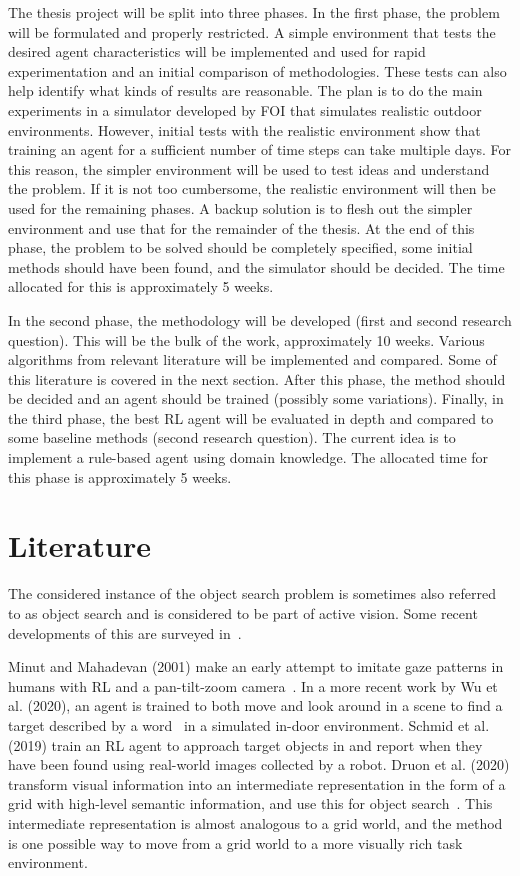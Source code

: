 \documentclass{article}
\begin{document}
The thesis project will be split into three phases. In the first phase, the problem will be formulated and properly restricted. A simple environment that tests the desired agent characteristics will be implemented and used for rapid experimentation and an initial comparison of methodologies. These tests can also help identify what kinds of results are reasonable. The plan is to do the main experiments in a simulator developed by FOI that simulates realistic outdoor environments. However, initial tests with the realistic environment show that training an agent for a sufficient number of time steps can take multiple days. For this reason, the simpler environment will be used to test ideas and understand the problem. If it is not too cumbersome, the realistic environment will then be used for the remaining phases. A backup solution is to flesh out the simpler environment and use that for the remainder of the thesis. At the end of this phase, the problem to be solved should be completely specified, some initial methods should have been found, and the simulator should be decided. The time allocated for this is approximately 5 weeks.

In the second phase, the methodology will be developed (first and second research question). This will be the bulk of the work, approximately 10 weeks. Various algorithms from relevant literature will be implemented and compared. Some of this literature is covered in the next section. After this phase, the method should be decided and an agent should be trained (possibly some variations). Finally, in the third phase, the best RL agent will be evaluated in depth and compared to some baseline methods (second research question). The current idea is to implement a rule-based agent using domain knowledge. The allocated time for this phase is approximately 5 weeks.

\section{Literature}

The considered instance of the object search problem is sometimes also referred to as object search and is considered to be part of active vision. Some recent developments of this are surveyed in~\cite{chen2011}.

Minut and Mahadevan (2001) make an early attempt to imitate gaze patterns in humans with RL and a pan-tilt-zoom camera~\cite{minut2001}. In a more recent work by Wu et al. (2020), an agent is trained to both move and look around in a scene to find a target described by a word~\cite{wu2020} in a simulated in-door environment. Schmid et al. (2019) train an RL agent to approach target objects in and report when they have been found using real-world images collected by a robot. Druon et al. (2020) transform visual information into an intermediate representation in the form of a grid with high-level semantic information, and use this for object search~\cite{druon2020}. This intermediate representation is almost analogous to a grid world, and the method is one possible way to move from a grid world to a more visually rich task environment. 
\end{document}
